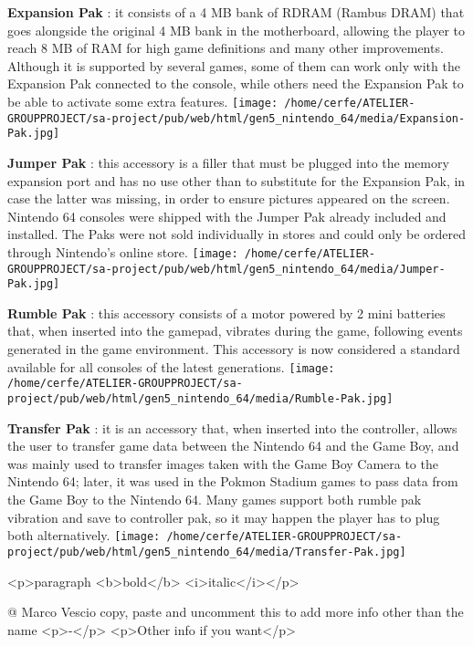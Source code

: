 \documentclass[a4paper,10pt]{book}
\begin{document}
 \textbf{Expansion Pak } : it consists of a 4 MB bank of RDRAM (Rambus DRAM) that goes alongside the original 4 MB bank in the motherboard, allowing the player to reach 8 MB of RAM for high game definitions and many other improvements. Although it is supported by several games, some of them can work only with the Expansion Pak connected to the console, while others need the Expansion Pak to be able to activate some extra features. 
 \texttt{[image: /home/cerfe/ATELIER-GROUPPROJECT/sa-project/pub/web/html/gen5\_nintendo\_64/media/Expansion-Pak.jpg]}
 
 \textbf{Jumper Pak } : this accessory is a filler that must be plugged into the memory expansion port and has no use other than to substitute for the Expansion Pak, in case the latter was missing, in order to ensure pictures appeared on the screen. Nintendo 64 consoles were shipped with the Jumper Pak already included and installed. The Paks were not sold individually in stores and could only be ordered through Nintendo's online store. 
 \texttt{[image: /home/cerfe/ATELIER-GROUPPROJECT/sa-project/pub/web/html/gen5\_nintendo\_64/media/Jumper-Pak.jpg]}
 
 \textbf{Rumble Pak } : this accessory consists of a motor powered by 2 mini batteries that, when inserted into the gamepad, vibrates during the game, following events generated in the game environment. This accessory is now considered a standard available for all consoles of the latest generations. 
 \texttt{[image: /home/cerfe/ATELIER-GROUPPROJECT/sa-project/pub/web/html/gen5\_nintendo\_64/media/Rumble-Pak.jpg]}
 
 \textbf{Transfer Pak } : it is an accessory that, when inserted into the controller, allows the user to transfer game data between the Nintendo 64 and the Game Boy, and was mainly used to transfer images taken with the Game Boy Camera to the Nintendo 64; later, it was used in the Pokmon Stadium games to pass data from the Game Boy to the Nintendo 64. 
                Many games support both rumble pak vibration and save to controller pak, so it may happen the player has to plug both alternatively. 
 \texttt{[image: /home/cerfe/ATELIER-GROUPPROJECT/sa-project/pub/web/html/gen5\_nintendo\_64/media/Transfer-Pak.jpg]}
 
 
 
 <p>paragraph <b>bold</b> <i>italic</i></p> 
 
 @ Marco Vescio 
  copy, paste and uncomment this to add more info other than the name
           <p>-</p>
           <p>Other info if you want</p>
          
\end{document}
